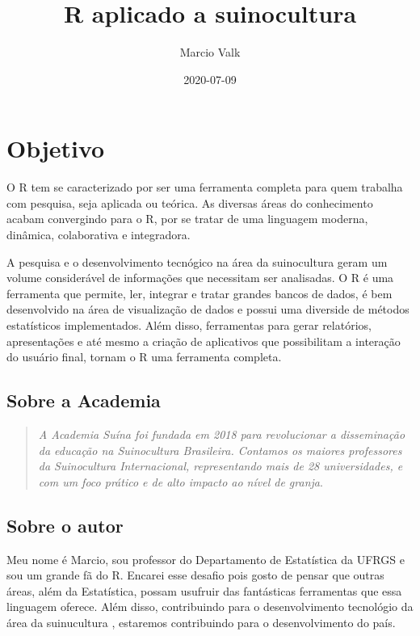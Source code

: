 \documentclass[
]{book}
\title{R aplicado a suinocultura}
\author{Marcio Valk}
\date{2020-07-09}
\begin{document}
\frontmatter
\maketitle

{
\setcounter{tocdepth}{1}
\tableofcontents
}
\mainmatter
\hypertarget{objetivo}{%
\chapter*{Objetivo}\label{objetivo}}

O R tem se caracterizado por ser uma ferramenta completa para quem trabalha com pesquisa, seja aplicada ou teórica. As diversas áreas do conhecimento acabam convergindo para o R, por se tratar de uma linguagem moderna, dinâmica, colaborativa e integradora.

A pesquisa e o desenvolvimento tecnógico na área da suinocultura geram um volume considerável de informações que necessitam ser analisadas. O R é uma ferramenta que permite, ler, integrar e tratar grandes bancos de dados, é bem desenvolvido na área de visualização de dados e possui uma diverside de métodos estatísticos implementados. Além disso, ferramentas para gerar relatórios, apresentações e até mesmo a criação de aplicativos que possibilitam a interação do usuário final, tornam o R uma ferramenta completa.

\hypertarget{sobre-a-academia}{%
\section*{Sobre a Academia}\label{sobre-a-academia}}

\begin{quote}
\emph{A Academia Suína foi fundada em 2018 para revolucionar a disseminação da educação na Suinocultura Brasileira. Contamos os maiores professores da Suinocultura Internacional, representando mais de 28 universidades, e com um foco prático e de alto impacto ao nível de granja}. \citep{academiasuina}
\end{quote}

\hypertarget{sobre-o-autor}{%
\section*{Sobre o autor}\label{sobre-o-autor}}

Meu nome é Marcio, sou professor do Departamento de Estatística da UFRGS e sou um grande fã do R. Encarei esse desafio pois gosto de pensar que outras áreas, além da Estatística, possam usufruir das fantásticas ferramentas que essa linguagem oferece. Além disso, contribuindo para o desenvolvimento tecnológio da área da suinucultura , estaremos contribuindo para o desenvolvimento do país.
\end{document}
